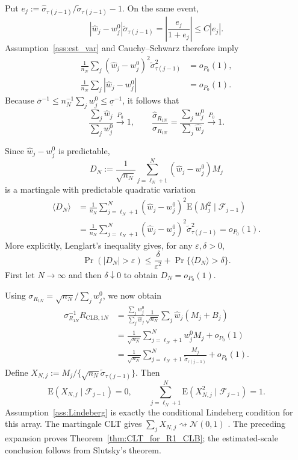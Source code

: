 \documentclass[12pt]{article}
\theoremstyle{remark}\newtheorem{remark}[theorem]{Remark}\theoremstyle{plain}
\newcommand{\E}{\mathrm{E}}
\begin{document}
Put
$e_j:=\widehat\sigma_{\tau(j-1)}
/\widetilde\sigma_{\tau(j-1)}-1$.  On the same event,
\[
    |\widehat w_j-w_j^0|
    \widetilde\sigma_{\tau(j-1)}
    =
    \left|\frac{e_j}{1+e_j}\right|
    \leq C|e_j|.
\]
Assumption~\ref{ass:est_var} and Cauchy--Schwarz therefore imply
\[
    \begin{aligned}
    \frac1{n_N}\sum_j
    (\widehat w_j-w_j^0)^2
    \widetilde\sigma_{\tau(j-1)}^2
    &=o_{P_0}(1),\\
    \frac1{n_N}\sum_j|\widehat w_j-w_j^0|
    &=o_{P_0}(1).
    \end{aligned}
\]
Because
$\overline\sigma^{-1}\leq n_N^{-1}\sum_jw_j^0
\leq\underline\sigma^{-1}$, it follows that
\[
    \frac{\sum_j\widehat w_j}{\sum_jw_j^0}\overset{P_0}{\to}1,
    \qquad
    \frac{\widehat\sigma_{R_{1N}}}{\sigma_{R_{1N}}}
    =\frac{\sum_jw_j^0}{\sum_j\widehat w_j}
    \overset{P_0}{\to}1.
\]

Since $\widehat w_j-w_j^0$ is predictable,
\[
    D_N:=\frac1{\sqrt{n_N}}
    \sum_{j=\ell_N+1}^N(\widehat w_j-w_j^0)M_j
\]
is a martingale with predictable quadratic variation
\[
    \begin{aligned}
    \langle D_N\rangle
    &=
    \frac1{n_N}\sum_{j=\ell_N+1}^N
    (\widehat w_j-w_j^0)^2
    \E(M_j^2\mid\mathcal F_{j-1})\\
    &=
    \frac1{n_N}\sum_{j=\ell_N+1}^N
    (\widehat w_j-w_j^0)^2
    \widetilde\sigma_{\tau(j-1)}^2
    =o_{P_0}(1).
    \end{aligned}
\]
More explicitly, Lenglart's inequality gives, for any
$\varepsilon,\delta>0$,
\[
    \Pr(|D_N|>\varepsilon)
    \leq\frac{\delta}{\varepsilon^2}
    +\Pr\{\langle D_N\rangle>\delta\}.
\]
First let $N\to\infty$ and then $\delta\downarrow0$ to obtain
$D_N=o_{P_0}(1)$.

Using
$\sigma_{R_{1N}}=\sqrt{n_N}/\sum_jw_j^0$, we now obtain
\[
    \begin{aligned}
    \sigma_{R_{1N}}^{-1}R_{\mathrm{CLB},1N}
    &=
    \frac{\sum_jw_j^0}{\sum_j\widehat w_j}
    \frac1{\sqrt{n_N}}
    \sum_j\widehat w_j(M_j+B_j)\\
    &=
    \frac1{\sqrt{n_N}}\sum_{j=\ell_N+1}^Nw_j^0M_j
    +o_{P_0}(1)\\
    &=
    \frac{1}{\sqrt{n_N}}
    \sum_{j=\ell_N+1}^N
    \frac{M_j}{\widetilde\sigma_{\tau(j-1)}}
    +o_{P_0}(1).
    \end{aligned}
\]
Define
$X_{N,j}:=M_j/
\{\sqrt{n_N}\widetilde\sigma_{\tau(j-1)}\}$.
Then
\[
    \E(X_{N,j}\mid\mathcal F_{j-1})=0,
    \qquad
    \sum_{j=\ell_N+1}^N
    \E(X_{N,j}^2\mid\mathcal F_{j-1})=1.
\]
Assumption~\ref{ass:Lindeberg} is exactly the conditional Lindeberg
condition for this array.  The martingale CLT gives
$\sum_jX_{N,j}\rightsquigarrow\mathcal N(0,1)$
\citep{hall2014martingale}.
The preceding expansion proves Theorem~\ref{thm:CLT_for_R1_CLB};
the estimated-scale conclusion follows from Slutsky's theorem.
\end{document}
